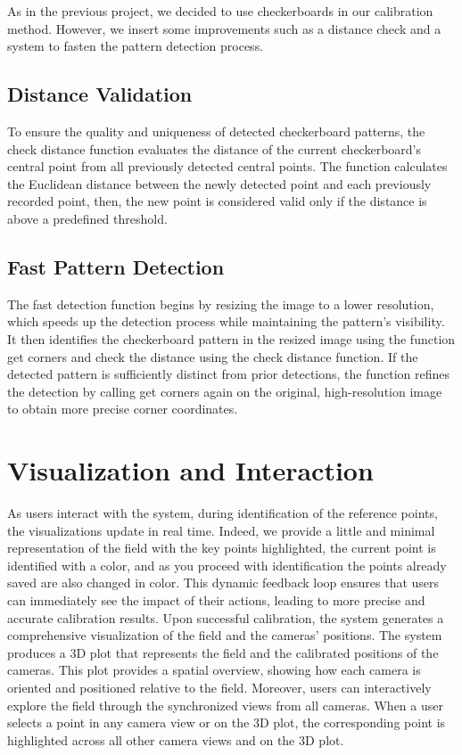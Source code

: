 \documentclass{template}
\begin{document}
As in the previous project, we decided to use checkerboards in our calibration method. 
However, we insert some improvements such as a distance check and a system to fasten the pattern detection process.

\subsection{Distance Validation}
To ensure the quality and uniqueness of detected checkerboard patterns, the check distance function evaluates the distance of the current checkerboard's central point from all previously detected central points. 
The function calculates the Euclidean distance between the newly detected point and each previously recorded point, then, the new point is considered valid only if the distance is above a predefined threshold.

\subsection{Fast Pattern Detection}
The fast detection function begins by resizing the image to a lower resolution, which speeds up the detection process while maintaining the pattern’s visibility. 
It then identifies the checkerboard pattern in the resized image using the function get corners and check the distance using the check distance function.
If the detected pattern is sufficiently distinct from prior detections, the function refines the detection by calling get corners again on the original, high-resolution image to obtain more precise corner coordinates. 

\section{Visualization and Interaction}
As users interact with the system, during identification of the reference points, the visualizations update in real time. 
Indeed, we provide a little and minimal representation of the field with the key points highlighted, the current point is identified with a color, and as you proceed with identification the points already saved are also changed in color. 
This dynamic feedback loop ensures that users can immediately see the impact of their actions, leading to more precise and accurate calibration results.
Upon successful calibration, the system generates a comprehensive visualization of the field and the cameras' positions. The system produces a 3D plot that represents the field and the calibrated positions of the cameras. 
This plot provides a spatial overview, showing how each camera is oriented and positioned relative to the field.
Moreover, users can interactively explore the field through the synchronized views from all cameras. When a user selects a point in any camera view or on the 3D plot, the corresponding point is highlighted across all other camera views and on the 3D plot. 
\end{document}
